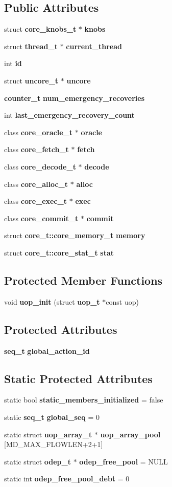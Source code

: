 \subsection*{Public Attributes}
\begin{CompactItemize}
\item 
struct {\bf core\_\-knobs\_\-t} $\ast$ {\bf knobs}
\item 
struct {\bf thread\_\-t} $\ast$ {\bf current\_\-thread}
\item 
int {\bf id}
\item 
struct {\bf uncore\_\-t} $\ast$ {\bf uncore}
\item 
{\bf counter\_\-t} {\bf num\_\-emergency\_\-recoveries}
\item 
int {\bf last\_\-emergency\_\-recovery\_\-count}
\item 
class {\bf core\_\-oracle\_\-t} $\ast$ {\bf oracle}
\item 
class {\bf core\_\-fetch\_\-t} $\ast$ {\bf fetch}
\item 
class {\bf core\_\-decode\_\-t} $\ast$ {\bf decode}
\item 
class {\bf core\_\-alloc\_\-t} $\ast$ {\bf alloc}
\item 
class {\bf core\_\-exec\_\-t} $\ast$ {\bf exec}
\item 
class {\bf core\_\-commit\_\-t} $\ast$ {\bf commit}
\item 
struct {\bf core\_\-t::core\_\-memory\_\-t} {\bf memory}
\item 
struct {\bf core\_\-t::core\_\-stat\_\-t} {\bf stat}
\end{CompactItemize}
\subsection*{Protected Member Functions}
\begin{CompactItemize}
\item 
void {\bf uop\_\-init} (struct {\bf uop\_\-t} $\ast$const uop)
\end{CompactItemize}
\subsection*{Protected Attributes}
\begin{CompactItemize}
\item 
{\bf seq\_\-t} {\bf global\_\-action\_\-id}
\end{CompactItemize}
\subsection*{Static Protected Attributes}
\begin{CompactItemize}
\item 
static bool {\bf static\_\-members\_\-initialized} = false
\item 
static {\bf seq\_\-t} {\bf global\_\-seq} = 0
\item 
static struct {\bf uop\_\-array\_\-t} $\ast$ {\bf uop\_\-array\_\-pool} [MD\_\-MAX\_\-FLOWLEN+2+1]
\item 
static struct {\bf odep\_\-t} $\ast$ {\bf odep\_\-free\_\-pool} = NULL
\item 
static int {\bf odep\_\-free\_\-pool\_\-debt} = 0
\end{CompactItemize}
